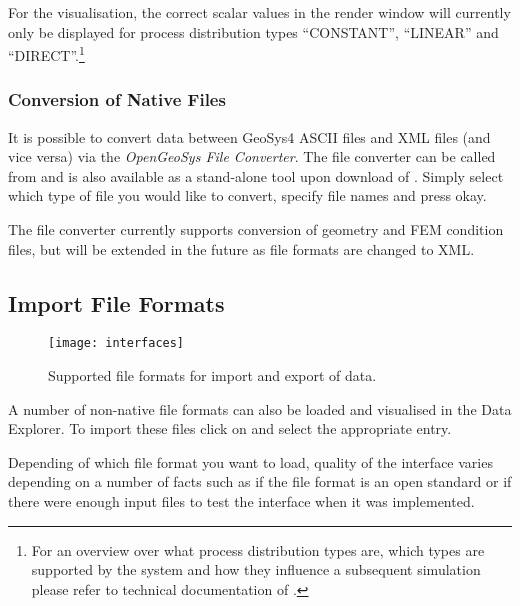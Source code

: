 For the visualisation, the correct scalar values in the render window will currently only be displayed for process distribution types ``CONSTANT'', ``LINEAR'' and ``DIRECT''.\footnote{For an overview over what process distribution types are, which types are supported by the system and how they influence a subsequent simulation please refer to technical documentation of \ogs.}

\subsubsection{Conversion of Native Files}

It is possible to convert data between GeoSys4 ASCII files and \ogs XML files (and vice versa) via the \emph{OpenGeoSys File Converter}. The file converter can be called from  and is also available as a stand-alone tool upon download of \ogs. Simply select which type of file you would like to convert, specify file names and press okay.

The file converter currently supports conversion of geometry and FEM condition files, but will be extended in the future as file formats are changed to XML.

\subsection{Import File Formats}
\label{Import File Formats}

\begin{figure}[tb]
\begin{center}
\texttt{[image: interfaces]}
\caption{Supported file formats for import and export of data.}
\label{fig:interfaces}
\end{center}
\end{figure}

A number of non-native file formats can also be loaded and visualised in the Data Explorer. To import these files click on  and select the appropriate entry.

Depending of which file format you want to load, quality of the interface varies depending on a number of facts such as if the file format is an open standard or if there were enough input files to test the interface when it was implemented.


